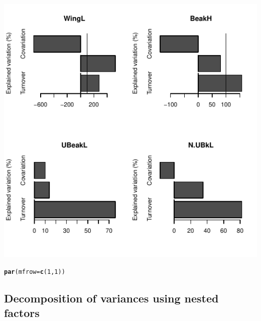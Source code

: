 \documentclass[12pt]{article}\usepackage[]{graphicx}\usepackage[]{color}
\makeatletter
\def\maxwidth{ %
  \ifdim\Gin@nat@width>\linewidth
    \linewidth
  \else
    \Gin@nat@width
  \fi
}
\newcommand{\hlnum}[1]{\textcolor[rgb]{0.686,0.059,0.569}{#1}}%
\newcommand{\hlstd}[1]{\textcolor[rgb]{0.345,0.345,0.345}{#1}}%
\newcommand{\hlkwc}[1]{\textcolor[rgb]{0.333,0.667,0.333}{#1}}%
\newcommand{\hlkwd}[1]{\textcolor[rgb]{0.737,0.353,0.396}{\textbf{#1}}}%
\newenvironment{kframe}{%
 \def\at@end@of@kframe{}%
 \ifinner\ifhmode%
  \def\at@end@of@kframe{\end{minipage}}%
  \begin{minipage}{\columnwidth}%
 \fi\fi%
 \def\FrameCommand##1{\hskip\@totalleftmargin \hskip-\fboxsep
 \colorbox{shadecolor}{##1}\hskip-\fboxsep
     \hskip-\linewidth \hskip-\@totalleftmargin \hskip\columnwidth}%
 \MakeFramed {\advance\hsize-\width
   \@totalleftmargin\z@ \linewidth\hsize
   \@setminipage}}%
 {\par\unskip\endMakeFramed%
 \at@end@of@kframe}
\newenvironment{knitrout}{}{} %
\makeatother
\begin{document}
\begin{knitrout}
{\centering \includegraphics[width=\maxwidth]{figure/unnamed-chunk-142} 

}


\begin{kframe}\begin{alltt}
\hlkwd{par}\hlstd{(}\hlkwc{mfrow} \hlstd{=} \hlkwd{c}\hlstd{(}\hlnum{1}\hlstd{,} \hlnum{1}\hlstd{))}
\end{alltt}
\end{kframe}
\end{knitrout}



\newpage

\subsection{Decomposition of variances using nested factors}
\end{document}
